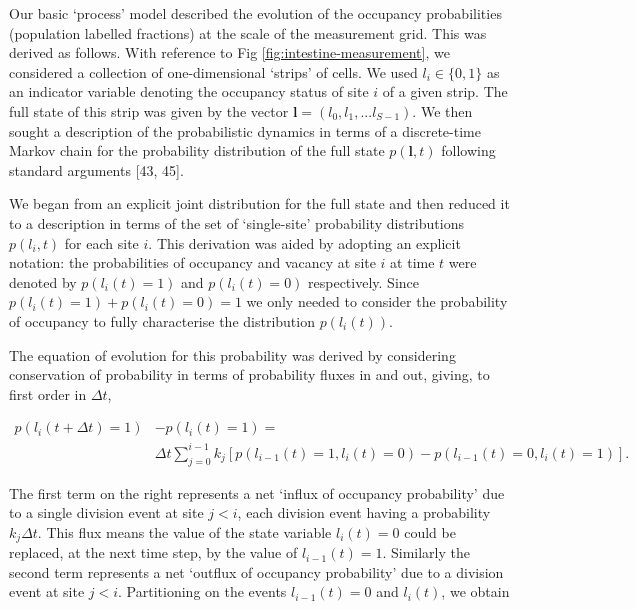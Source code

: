 \documentclass[10pt,letterpaper]{article}
\begin{document}

Our basic `process' model described the evolution of the occupancy
probabilities (population labelled fractions) at the scale of the
measurement grid. This was derived as follows. With reference to Fig
\ref{fig:intestine-measurement}, we considered a collection of
one-dimensional `strips' of cells. We used \(l_i \in \{0,1\}\) as an
indicator variable denoting the occupancy status of site \(i\) of a
given strip. The full state of this strip was given by the vector
\(\mathbf{l} = (l_0,l_1,...l_{S-1})\). We then sought a description of
the probabilistic dynamics in terms of a discrete-time Markov chain for
the probability distribution of the full state \(p(\mathbf{l},t)\)
following standard arguments {[}43, 45{]}.

We began from an explicit joint distribution for the full state and then
reduced it to a description in terms of the set of `single-site'
probability distributions \(p(l_i,t)\) for each site \(i\). This
derivation was aided by adopting an explicit notation: the probabilities
of occupancy and vacancy at site \(i\) at time \(t\) were denoted by
\(p(l_i(t)=1)\) and \(p(l_i(t)=0)\) respectively. Since
\(p(l_i(t)=1)+ p(l_i(t)=0) = 1\) we only needed to consider the
probability of occupancy to fully characterise the distribution
\(p(l_i(t))\).

The equation of evolution for this probability was derived by
considering conservation of probability in terms of probability fluxes
in and out, giving, to first order in \(\Delta t\),

\begin{align}p(l_i(t+\Delta t)=1) &- p(l_i(t)=1) = \nonumber \\ &\Delta t\sum_{j=0}^{i-1}k_j\left[p(l_{i-1}(t)=1,l_{i}(t)=0)-p(l_{i-1}(t)=0,l_{i}(t)=1)\right]. \end{align}

The first term on the right represents a net `influx of occupancy
probability' due to a single division event at site \(j < i\), each
division event having a probability \(k_j\Delta t\). This flux means the
value of the state variable \(l_i(t) = 0\) could be replaced, at the
next time step, by the value of \(l_{i-1}(t) = 1\). Similarly the second
term represents a net `outflux of occupancy probability' due to a
division event at site \(j < i\). Partitioning on the events
\(l_{i-1}(t)=0\) and \(l_i(t)\), we obtain
\end{document}
